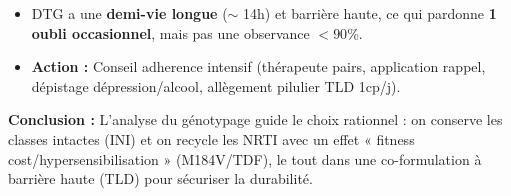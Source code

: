 \documentclass[11pt]{article}
\begin{document}
\begin{exoresolu}
\begin{enumerate}
\begin{itemize}
        \item DTG a une \textbf{demi-vie longue} ($\sim$ 14h) et barrière haute, ce qui pardonne \textbf{1 oubli occasionnel}, mais pas une observance $< 90\%$.
        \item \textbf{Action :} Conseil adherence intensif (thérapeute pairs, application rappel, dépistage dépression/alcool, allègement pilulier TLD 1cp/j).
    \end{itemize}
\end{enumerate}
\textbf{Conclusion :} L'analyse du génotypage guide le choix rationnel : on conserve les classes intactes (INI) et on recycle les NRTI avec un effet « fitness cost/hypersensibilisation » (M184V/TDF), le tout dans une co-formulation à barrière haute (TLD) pour sécuriser la durabilité.
\end{exoresolu}
\end{document}
